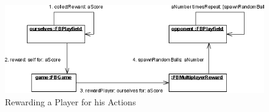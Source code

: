 %
%
\begin{figure}[bt]
  \begin{center}
    \includegraphics[width=\linewidth]{images/RewardingAPlayer.png}
  \end{center}
  \caption{Rewarding a Player for his Actions}
  \label{fig:RewardingAPlayer}
\end{figure}
%